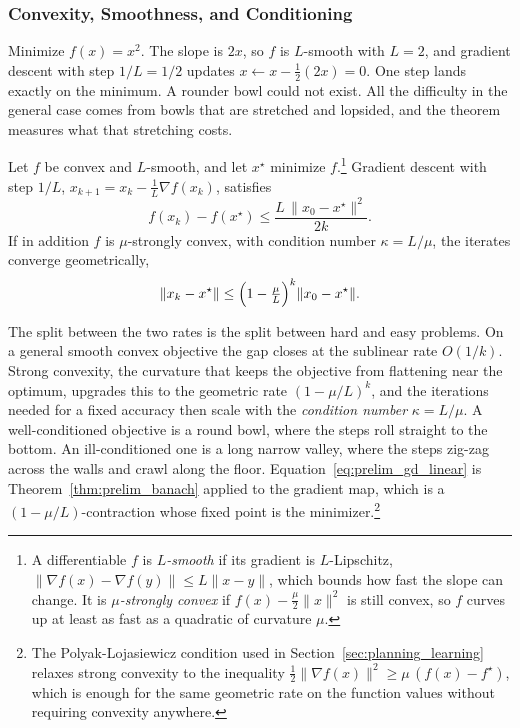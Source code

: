 \subsubsection{Convexity, Smoothness, and Conditioning}
\label{prelim:quadratic_forms}

Minimize $f(x) = x^2$. The slope is $2x$, so $f$ is $L$-smooth with $L = 2$, and gradient descent with step $1/L = 1/2$ updates $x \leftarrow x - \tfrac{1}{2}(2x) = 0$. One step lands exactly on the minimum. A rounder bowl could not exist. All the difficulty in the general case comes from bowls that are stretched and lopsided, and the theorem measures what that stretching costs.

\begin{theorem}
\label{thm:prelim_gd}
Let $f$ be convex and $L$-smooth, and let $x^\star$ minimize $f$.\footnote{A differentiable $f$ is \emph{$L$-smooth} if its gradient is $L$-Lipschitz, $\|\nabla f(x) - \nabla f(y)\| \leq L\|x - y\|$, which bounds how fast the slope can change. It is \emph{$\mu$-strongly convex} if $f(x) - \tfrac{\mu}{2}\|x\|^2$ is still convex, so $f$ curves up at least as fast as a quadratic of curvature $\mu$.} Gradient descent with step $1/L$, $x_{k+1} = x_k - \tfrac{1}{L}\nabla f(x_k)$, satisfies
\begin{equation}
f(x_k) - f(x^\star) \leq \frac{L\,\|x_0 - x^\star\|^2}{2k}.
\label{eq:prelim_gd_sublinear}
\end{equation}
If in addition $f$ is $\mu$-strongly convex, with condition number $\kappa = L/\mu$, the iterates converge geometrically,
\begin{equation}
\|x_k - x^\star\| \leq \Bigl(1 - \tfrac{\mu}{L}\Bigr)^{k} \|x_0 - x^\star\|.
\label{eq:prelim_gd_linear}
\end{equation}
\end{theorem}

The split between the two rates is the split between hard and easy problems. On a general smooth convex objective the gap closes at the sublinear rate $O(1/k)$. Strong convexity, the curvature that keeps the objective from flattening near the optimum, upgrades this to the geometric rate $(1 - \mu/L)^k$, and the iterations needed for a fixed accuracy then scale with the \emph{condition number} $\kappa = L/\mu$. A well-conditioned objective is a round bowl, where the steps roll straight to the bottom. An ill-conditioned one is a long narrow valley, where the steps zig-zag across the walls and crawl along the floor. Equation~\eqref{eq:prelim_gd_linear} is Theorem~\ref{thm:prelim_banach} applied to the gradient map, which is a $(1 - \mu/L)$-contraction whose fixed point is the minimizer.\footnote{The Polyak-Lojasiewicz condition used in Section~\ref{sec:planning_learning} relaxes strong convexity to the inequality $\tfrac{1}{2}\|\nabla f(x)\|^2 \geq \mu\,(f(x) - f^\star)$, which is enough for the same geometric rate on the function values without requiring convexity anywhere.}

